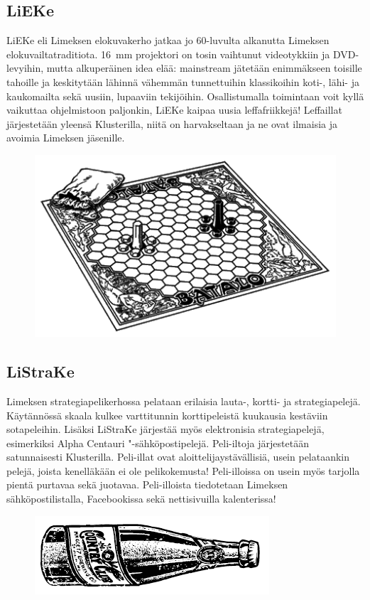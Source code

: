 \documentclass[a5paper, 8pt, twocolumn]{book} %
\numberwithin{equation}{section}
\begin{document}
\subsection*{LiEKe}
LiEKe eli Limeksen elokuvakerho jatkaa
jo 60-luvulta alkanutta Limeksen elokuvailtatraditiota.
16~mm projektori on tosin
vaihtunut videotykkiin ja DVD-levyihin,
mutta alkuperäinen idea elää: mainstream
jätetään enimmäkseen toisille tahoille ja
keskitytään lähinnä vähemmän tunnettuihin
klassikoihin koti-, lähi- ja kaukomailta
sekä uusiin, lupaaviin tekijöihin. Osallistumalla
toimintaan voit kyllä vaikuttaa ohjelmistoon
paljonkin, LiEKe kaipaa uusia
leffafriikkejä! Leffaillat järjestetään yleensä
Klusterilla, niitä on harvakseltaan ja ne
ovat ilmaisia ja avoimia Limeksen jäsenille.

\begin{figure}[h!]
	\centering
	\includegraphics[width=0.8\columnwidth]{listrake.png}
\end{figure}
\subsection*{LiStraKe}
Limeksen strategiapelikerhossa
pelataan erilaisia lauta-,
kortti- ja strategiapelejä. Käytännössä
skaala kulkee varttitunnin korttipeleistä
kuukausia kestäviin sotapeleihin. Lisäksi
LiStraKe järjestää myös elektronisia strategiapelejä,
esimerkiksi Alpha Centauri "-sähkö\-posti\-pelejä.
Peli-iltoja järjestetään satunnaisesti
Klusterilla. Peli-illat ovat aloittelijaystävällisiä,
usein pelataankin pelejä, joista kenelläkään
ei ole pelikokemusta! Peli-illoissa
on usein myös tarjolla pientä purtavaa sekä
juotavaa. Peli-illoista tiedotetaan Limeksen
sähköpostilistalla, Facebookissa sekä nettisivuilla
kalenterissa!

\begin{figure}[h!]
	\centering
	\includegraphics[width=0.8\columnwidth]{lipuke.png}
\end{figure}
\end{document}
